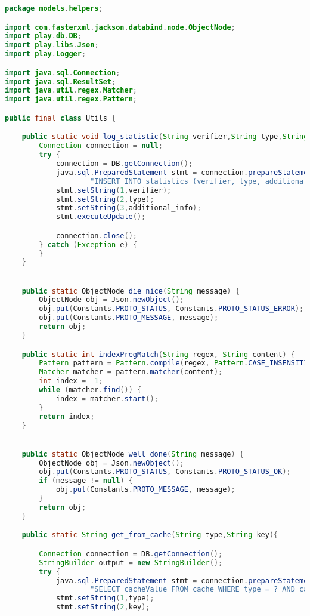 \begin{lstlisting}[language=Java,basicstyle=\tiny,caption=Utils.java]
package models.helpers;

import com.fasterxml.jackson.databind.node.ObjectNode;
import play.db.DB;
import play.libs.Json;
import play.Logger;

import java.sql.Connection;
import java.sql.ResultSet;
import java.util.regex.Matcher;
import java.util.regex.Pattern;

public final class Utils {

    public static void log_statistic(String verifier,String type,String additional_info){
        Connection connection = null;
        try {
            connection = DB.getConnection();
            java.sql.PreparedStatement stmt = connection.prepareStatement(
                    "INSERT INTO statistics (verifier, type, additionalInfo) VALUES ?,?,?");
            stmt.setString(1,verifier);
            stmt.setString(2,type);
            stmt.setString(3,additional_info);
            stmt.executeUpdate();

            connection.close();
        } catch (Exception e) {
        }
    }


    public static ObjectNode die_nice(String message) {
        ObjectNode obj = Json.newObject();
        obj.put(Constants.PROTO_STATUS, Constants.PROTO_STATUS_ERROR);
        obj.put(Constants.PROTO_MESSAGE, message);
        return obj;
    }

    public static int indexPregMatch(String regex, String content) {
        Pattern pattern = Pattern.compile(regex, Pattern.CASE_INSENSITIVE);
        Matcher matcher = pattern.matcher(content);
        int index = -1;
        while (matcher.find()) {
            index = matcher.start();
        }
        return index;
    }


    public static ObjectNode well_done(String message) {
        ObjectNode obj = Json.newObject();
        obj.put(Constants.PROTO_STATUS, Constants.PROTO_STATUS_OK);
        if (message != null) {
            obj.put(Constants.PROTO_MESSAGE, message);
        }
        return obj;
    }

    public static String get_from_cache(String type,String key){

        Connection connection = DB.getConnection();
        StringBuilder output = new StringBuilder();
        try {
            java.sql.PreparedStatement stmt = connection.prepareStatement(
                    "SELECT cacheValue FROM cache WHERE type = ? AND cacheKey = ?");
            stmt.setString(1,type);
            stmt.setString(2,key);


\end{lstlisting}
